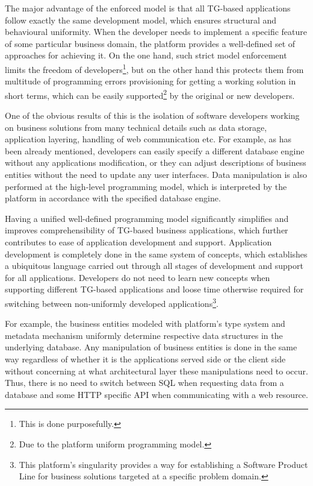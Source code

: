  The major advantage of the enforced model is that all TG-based applications follow exactly the same development model, which ensures structural and behavioural uniformity.
  When the developer needs to implement a specific feature of some particular business domain, the platform provides a well-defined set of approaches for achieving it.
  On the one hand, such strict model enforcement limits the freedom of developers\footnote{This is done purposefully.}, but on the other hand this protects them from multitude of programming errors provisioning for getting a working solution in short terms, which can be easily supported\footnote{Due to the platform uniform programming model.} by the original or new developers.

  One of the obvious results of this is the isolation of software developers working on business solutions from many technical details such as data storage, application layering, handling of web communication etc.
  For example, as has been already mentioned, developers can easily specify a different database engine without any applications modification, or they can adjust descriptions of business entities without the need to update any user interfaces.
  Data manipulation is also performed at the high-level programming model, which is interpreted by the platform in accordance with the specified database engine.
  
  Having a unified well-defined programming model significantly simplifies and improves comprehensibility of TG-based business applications, which further contributes to ease of application development and support.
  Application development is completely done in the same system of concepts, which establishes a ubiquitous language carried out through all stages of development and support for all applications.
  Developers do not need to learn new concepts when supporting different TG-based applications and loose time otherwise required for switching between non-uniformly developed applications\footnote{This platform's singularity provides a way for establishing a Software Product Line for business solutions targeted at a specific problem domain.}.
  
  For example, the business entities modeled with platform's type system and metadata mechanism uniformly determine respective data structures in the underlying database.
  Any manipulation of business entities is done in the same way regardless of whether it is the applications served side or the client side without concerning at what architectural layer these manipulations need to occur.
  Thus, there is no need to switch between SQL when requesting data from a database and some HTTP specific API when communicating with a web resource.

